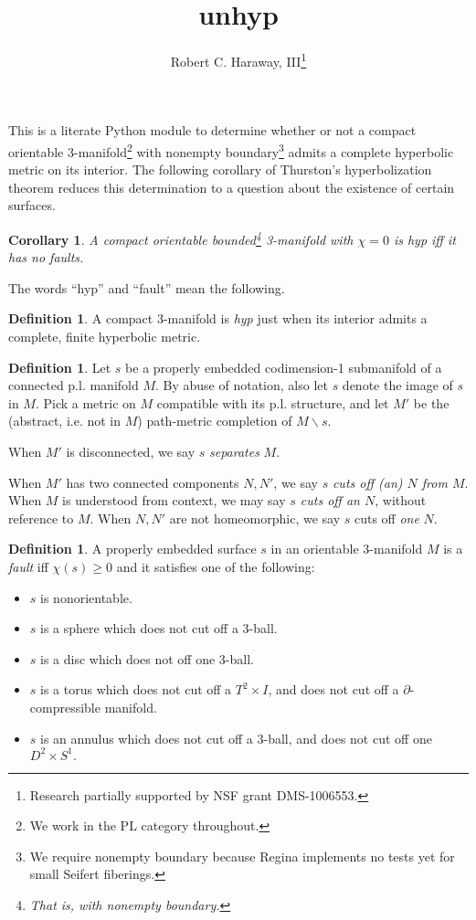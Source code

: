 \documentclass[10pt,twocolumn]{article}%
\newtheorem{Cor}[Thm]{Corollary}
\theoremstyle{definition}
\newtheorem{Def}[Thm]{Definition}
\begin{document}
\pagestyle{noweb}
\nwdocspar
\title{{\Tt{}unhyp\nwendquote}}
\author{Robert C. Haraway, III\thanks{Research
partially supported by NSF grant DMS-1006553.}}
\maketitle
\paragraph{}
This is a literate {\Tt{}Python\nwendquote} module
to determine whether or not a compact
orientable 3-manifold\footnote{We work
in the PL category throughout.} with 
nonempty boundary\footnote{We require nonempty
boundary because Regina implements no
tests yet for small Seifert fiberings.} admits a complete 
hyperbolic metric on its interior.
\nwenddocs{}\nwdocspar
The following corollary of Thurston's
hyperbolization theorem reduces this
determination to a question about
the existence of certain surfaces.
\begin{Cor}\label{cor:hyp}
A compact orientable 
bounded\footnote{That is, 
with nonempty boundary.} 
3-manifold with $\chi = 0$ 
is hyp iff
it has no faults.
\end{Cor}
\nwenddocs{}\nwdocspar
The words ``hyp'' and ``fault'' mean the following.
\begin{Def}
A compact 3-manifold is \emph{hyp} just
when its interior admits a complete, finite
hyperbolic metric.
\end{Def}
\begin{Def}
Let $s$ be a properly embedded codimension-1 
submanifold of a connected p.l. manifold $M$. 
By abuse of notation,
also let $s$ denote the image of $s$ in $M$.
Pick a metric on $M$ compatible 
with its p.l. structure,
and let $M'$ be the (abstract, i.e. not in $M$)
path-metric completion of
$M \smallsetminus s$.

When $M'$ is disconnected, 
we say $s$ \emph{separates} $M$.

When $M'$ has two connected components
$N,N'$, we say $s$ \emph{cuts off (an)
$N$ from $M$}. When $M$ is understood
from context, we may say \emph{$s$ cuts off an $N$},
without reference to $M$.
When $N,N'$ are not homeomorphic, we say
$s$ cuts off \emph{one} $N$.
\end{Def}
\nwenddocs{}\nwdocspar
\begin{Def}
A properly embedded surface $s$ 
in an orientable 3-manifold $M$ is a \emph{fault} 
iff $\chi(s) \geq 0$ and it satisfies one of the following:
\begin{itemize}
\item $s$ is nonorientable.
\item $s$ is a sphere which does not cut off a 3-ball.
\item $s$ is a disc which does not off one 3-ball.
\item $s$ is a torus which does not cut off a
$T^2 \times I$, and does not cut off
a $\partial$-compressible manifold.
\item $s$ is an annulus which does not cut off 
a 3-ball, and does not cut off one $D^2 \times S^1.$
\end{itemize}
\end{Def}
\end{document}
